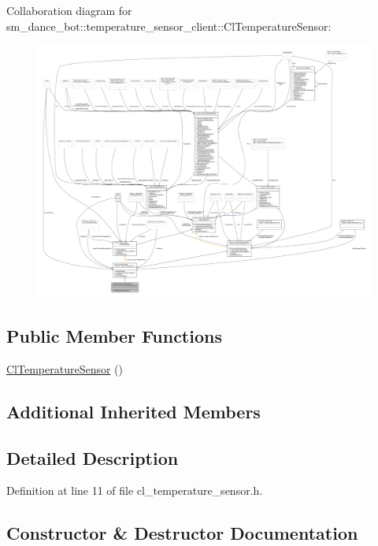 Collaboration diagram for sm\+\_\+dance\+\_\+bot\+:\+:temperature\+\_\+sensor\+\_\+client\+:\+:Cl\+Temperature\+Sensor\+:
\nopagebreak
\begin{figure}[H]
\begin{center}
\leavevmode
\includegraphics[width=350pt]{classsm__dance__bot_1_1temperature__sensor__client_1_1ClTemperatureSensor__coll__graph}
\end{center}
\end{figure}
\subsection*{Public Member Functions}
\begin{DoxyCompactItemize}
\item 
\hyperlink{classsm__dance__bot_1_1temperature__sensor__client_1_1ClTemperatureSensor_a213ca54aa390ec596d980ebd15141afa}{Cl\+Temperature\+Sensor} ()
\end{DoxyCompactItemize}
\subsection*{Additional Inherited Members}


\subsection{Detailed Description}


Definition at line 11 of file cl\+\_\+temperature\+\_\+sensor.\+h.



\subsection{Constructor \& Destructor Documentation}
